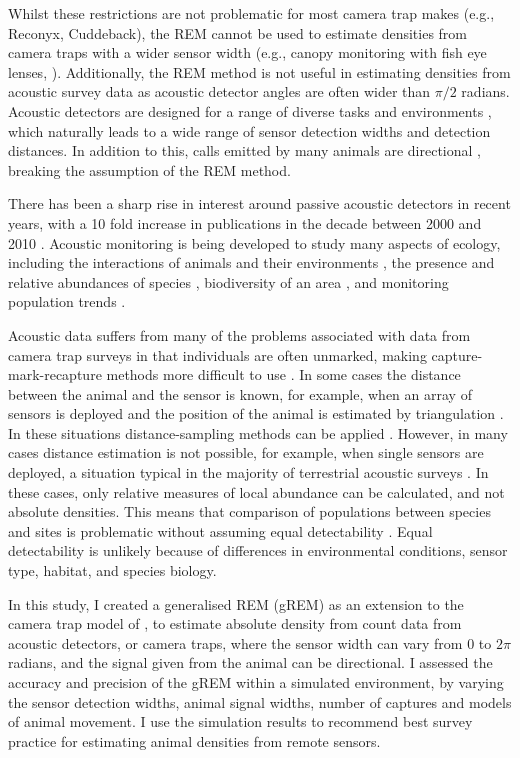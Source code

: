 Whilst these restrictions are not problematic for most camera trap makes (e.g., Reconyx, Cuddeback), the REM cannot be used to estimate densities from camera traps with a wider sensor width (e.g., canopy monitoring with fish eye lenses, \cite{brusa2014increasing}).
Additionally, the REM method is not useful in estimating densities from acoustic survey data as acoustic detector angles are often wider than $\pi/2$ radians.  Acoustic detectors are designed for a range of diverse tasks and environments \cite{kessel2014review}, which naturally leads to a wide range of sensor detection widths and detection distances.
In addition to this, calls emitted by many animals are directional \cite{blumstein2011acoustic}, breaking the assumption of the REM method. 

There has been a sharp rise in interest around passive acoustic detectors in recent years, with a 10 fold increase in publications in the decade between 2000 and 2010 \cite{kessel2014review}.
Acoustic monitoring is being developed to study many aspects of ecology, including the interactions of animals and their environments \cite{blumstein2011acoustic, rogers2013density}, the presence and relative abundances of species \cite{marcoux2011local}, biodiversity of an area \cite{depraetere2012monitoring}, and monitoring population trends \cite{walters2013challenges}. 

Acoustic data suffers from many of the problems associated with data from camera trap surveys in that individuals are often unmarked, making capture-mark-recapture methods more difficult to use \cite{marques2013estimating}.
In some cases the distance between the animal and the sensor is known, for example, when an array of sensors is deployed and the position of the animal is estimated by triangulation \cite{lewis2007sperm}.
In these situations distance-sampling methods can be applied \cite{buckland2008estimating}.
However, in many cases distance estimation is not possible, for example, when single sensors are deployed, a situation typical in the majority of terrestrial acoustic surveys  \cite{buckland2008estimating}.
In these cases, only relative measures of local abundance can be calculated, and not absolute densities.
This means that comparison of populations between species and sites is problematic without assuming equal detectability \cite{schmidt2003count, walters2013challenges}.
Equal detectability is unlikely because of differences in environmental conditions, sensor type, habitat, and species biology. 

In this study, I created a generalised REM (gREM) as an extension to the camera trap model of \cite{rowcliffe2008estimating}, to estimate absolute density from count data from acoustic detectors, or camera traps, where the sensor width can vary from 0 to $2\pi$ radians, and the signal given from the animal can be directional.
I assessed the accuracy and precision of the gREM within a simulated environment, by varying the sensor detection widths, animal signal widths, number of captures and models of animal movement.
I use the simulation results to recommend best survey practice for estimating animal densities from remote sensors. 

